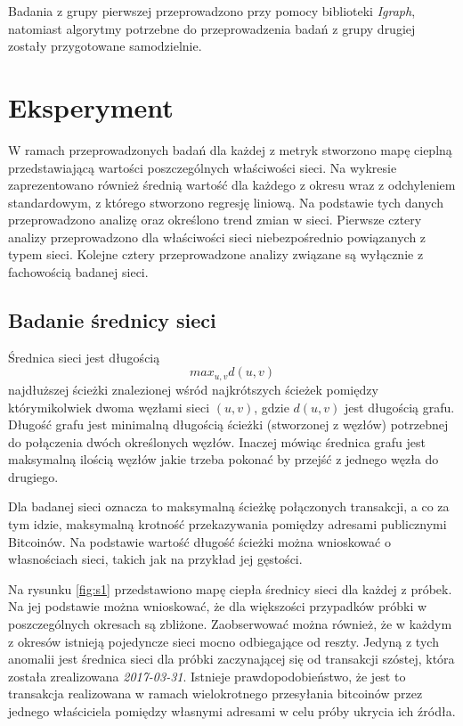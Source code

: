 \documentclass[12pt, twoside, final, openany]{mgr}
\begin{document}
\indent Badania z grupy pierwszej przeprowadzono przy pomocy biblioteki \textit{Igraph}, natomiast algorytmy potrzebne do przeprowadzenia badań z grupy drugiej zostały przygotowane samodzielnie.

\section{Eksperyment}
W ramach przeprowadzonych badań dla każdej z metryk stworzono mapę cieplną przedstawiającą wartości poszczególnych właściwości sieci. Na wykresie zaprezentowano również średnią wartość dla każdego z okresu wraz z odchyleniem standardowym, z którego stworzono regresję liniową. Na podstawie tych danych przeprowadzono analizę oraz określono trend zmian w sieci. Pierwsze cztery analizy przeprowadzono dla właściwości sieci niebezpośrednio powiązanych z typem sieci. Kolejne cztery przeprowadzone analizy związane są wyłącznie z fachowością badanej sieci.  

\subsection{Badanie średnicy sieci}
\label{srednica_sieci}
\indent Średnica sieci jest długością 
\begin{equation}
\label{eq:srednica_sieci}
	max_{u,v}d(u,v)
\end{equation}
najdłuższej ścieżki znalezionej wśród najkrótszych ścieżek pomiędzy którymikolwiek dwoma węzłami sieci $(u,v)$, gdzie $d(u,v)$ jest długością grafu. Długość grafu jest minimalną długością ścieżki (stworzonej z węzłów) potrzebnej do połączenia dwóch określonych węzłów. Inaczej mówiąc średnica grafu jest maksymalną ilością węzłów jakie trzeba pokonać by przejść z jednego węzła do drugiego.

\indent Dla badanej sieci oznacza to maksymalną ścieżkę połączonych transakcji, a co za tym idzie, maksymalną krotność przekazywania pomiędzy adresami publicznymi Bitcoinów. Na podstawie wartość długość ścieżki można wnioskować o własnościach sieci, takich jak na przykład jej gęstości.

\indent Na rysunku \ref{fig:s1} przedstawiono mapę ciepła średnicy sieci dla każdej z próbek. Na jej podstawie można wnioskować, że dla większości przypadków próbki w poszczególnych okresach są zbliżone. Zaobserwować można również, że w każdym z okresów istnieją pojedyncze sieci mocno odbiegające od reszty. Jedyną z tych anomalii jest średnica sieci dla próbki zaczynającej się od transakcji szóstej, która została zrealizowana \textit{2017-03-31}. Istnieje prawdopodobieństwo, że jest to transakcja realizowana w ramach wielokrotnego przesyłania bitcoinów przez jednego właściciela pomiędzy własnymi adresami w celu próby ukrycia ich źródła.
\end{document}
